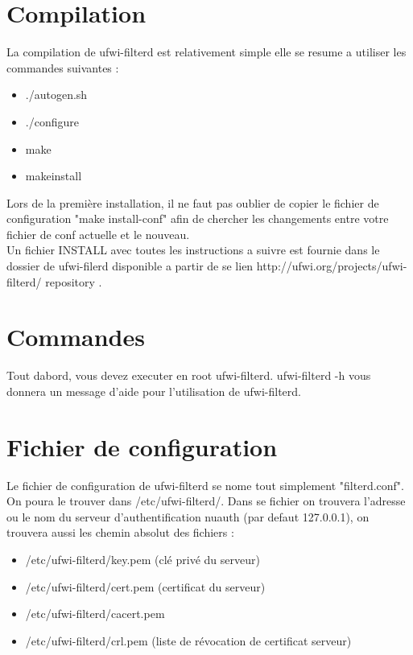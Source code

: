\documentclass[12pt]{report}
\begin{document}
\section{Compilation}
La compilation de ufwi-filterd est relativement simple elle se resume a utiliser les commandes suivantes :
\begin{itemize}
  \item ./autogen.sh
  \item ./configure
  \item make
  \item makeinstall
\end{itemize}
Lors de la première installation, il ne faut pas oublier de copier le fichier de configuration "make install-conf" afin de chercher les changements entre votre fichier de conf actuelle et le nouveau.\\
Un fichier INSTALL avec toutes les instructions a suivre est fournie dans le dossier de ufwi-filerd disponible a partir de se lien http://ufwi.org/projects/ufwi-filterd/ repository .
\section{Commandes}
Tout dabord, vous devez executer en root ufwi-filterd.
ufwi-filterd -h vous donnera un message d'aide pour l'utilisation de ufwi-filterd.
\section{Fichier de configuration}
Le fichier de configuration de ufwi-filterd se nome tout simplement "filterd.conf". On poura le trouver dans /etc/ufwi-filterd/.
Dans se fichier on trouvera l'adresse ou le nom du serveur d'authentification nuauth (par defaut 127.0.0.1), on trouvera aussi les chemin absolut des fichiers :
\begin{itemize}
  \item /etc/ufwi-filterd/key.pem (clé privé du serveur)
  \item /etc/ufwi-filterd/cert.pem (certificat du serveur)
  \item /etc/ufwi-filterd/cacert.pem
  \item /etc/ufwi-filterd/crl.pem (liste de révocation de certificat serveur)
\end{itemize}

\end{document}

